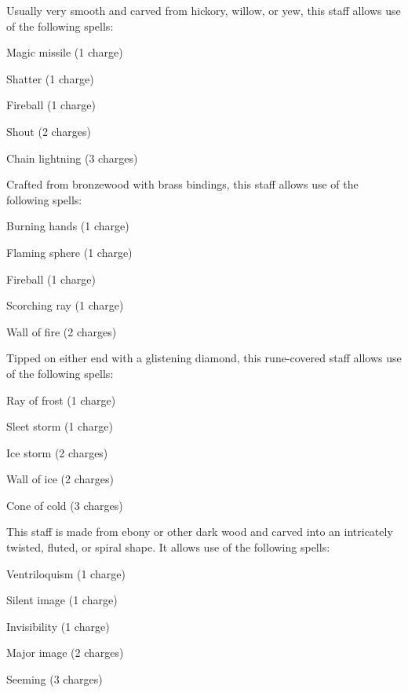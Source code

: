  Usually very smooth and carved from hickory, willow, or yew, this staff allows use of the following spells:
\begin{itemize*}
\item Magic missile (1 charge)
\item Shatter (1 charge)
\item Fireball (1 charge)
\item Shout (2 charges)
\item Chain lightning (3 charges)
\end{itemize*}


 Crafted from bronzewood with brass bindings, this staff allows use of the following spells:
\begin{itemize*}
\item Burning hands (1 charge)
\item Flaming sphere (1 charge)
\item Fireball (1 charge)
\item Scorching ray (1 charge)
\item Wall of fire (2 charges)
\end{itemize*}


 Tipped on either end with a glistening diamond, this rune-covered staff allows use of the following spells:
\begin{itemize*}
\item Ray of frost (1 charge)
\item Sleet storm (1 charge)
\item Ice storm  (2 charges)
\item Wall of ice (2 charges)
\item Cone of cold (3 charges)
\end{itemize*}


 This staff is made from ebony or other dark wood and carved into an intricately twisted, fluted, or spiral shape. It allows use of the following spells:
\begin{itemize*}
\item Ventriloquism (1 charge)
\item Silent image (1 charge)
\item Invisibility (1 charge)
\item Major image (2 charges)
\item Seeming (3 charges)
\end{itemize*}

